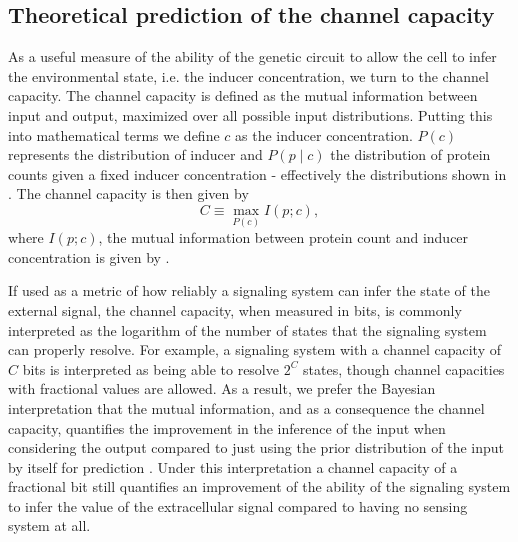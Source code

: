 \subsection{Theoretical prediction of the channel capacity}
\label{sec_channcap}

As a useful measure of the ability of the genetic circuit to allow the cell to
infer the environmental state, i.e. the inducer concentration, we turn to the
channel capacity. The channel capacity is defined as the mutual information
between input and output, maximized over all possible input distributions.
Putting this into mathematical terms we define $c$ as the inducer concentration.
$P(c)$ represents the distribution of inducer and $P(p \mid c)$ the distribution
of protein counts given a fixed inducer concentration - effectively the
distributions shown in . The channel capacity is then given by
\begin{equation}
  C \equiv \max_{P(c)} I(p; c),
  \label{eq_chann_cap}
\end{equation}
where $I(p; c)$, the mutual information between protein count and inducer
concentration is given by .

If used as a metric of how reliably a signaling system can infer the state of
the external signal, the channel capacity, when measured in bits, is commonly
interpreted as the logarithm of the number of states that the signaling system
can properly resolve. For example, a signaling system with a channel capacity of
$C$ bits is interpreted as being able to resolve $2^C$ states, though channel
capacities with fractional values are allowed. As a result, we prefer the
Bayesian interpretation that the mutual information, and as a consequence the
channel capacity, quantifies the improvement in the inference of the input when
considering the output compared to just using the prior distribution of the
input by itself for prediction \cite{Voliotis2014a, Bowsher2014}. Under this
interpretation a channel capacity of a fractional bit still quantifies an
improvement of the ability of the signaling system to infer the value of the
extracellular signal compared to having no sensing system at all.

